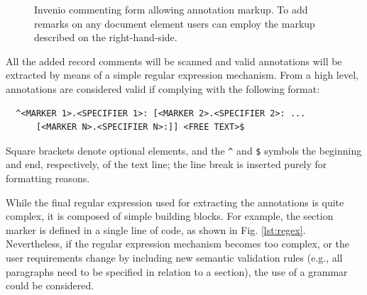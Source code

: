\begin{figure}[!ht]
  \centering
  \caption[Invenio commenting form allowing annotation markup]
          {Invenio commenting form allowing annotation markup. To add remarks
           on any document element users can employ the markup described on the
           right-hand-side.}
  \label{fig:noteform}
\end{figure}

All the added record comments will be scanned and valid annotations will be
extracted by means of a simple regular expression mechanism. From a high level,
annotations are considered valid if complying with the following format:
\begin{verbatim}
  ^<MARKER 1>.<SPECIFIER 1>: [<MARKER 2>.<SPECIFIER 2>: ...
      [<MARKER N>.<SPECIFIER N>:]] <FREE TEXT>$
\end{verbatim}
Square brackets denote optional elements, and the \texttt{\^} and \texttt{\$}
symbols the beginning and end, respectively, of the text line; the line break
is inserted purely for formatting reasons.

While the final regular expression used for extracting the annotations is quite
complex, it is composed of simple building blocks. For example, the section
marker is defined in a single line of code, as shown in Fig. \ref{lst:regex}.
Nevertheless, if the regular expression mechanism becomes too complex, or the
user requirements change by including new semantic validation rules (e.g., all
paragraphs need to be specified in relation to a section), the use of a
grammar could be considered.

